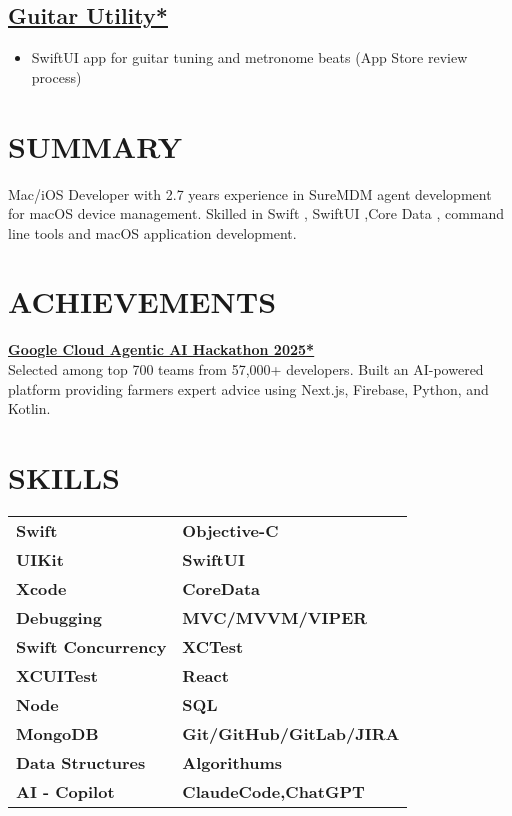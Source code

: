 \documentclass[10pt,a4paper]{moderncv}
\let\oldhref\href
\renewcommand{\href}[2]{\oldhref{#1}{\underline{#2}}}
\begin{document}
\begin{minipage}[t]{0.60\textwidth}
\subsection{\href{https://github.com/sachin6174/Guitar-Utility}{Guitar Utility*}}
\begin{itemize}
    \item SwiftUI app for guitar tuning and metronome beats (App Store review process)
\end{itemize}

\end{minipage}
\hfill
\begin{minipage}[t]{0.35\textwidth}
\section{SUMMARY}
Mac/iOS Developer with 2.7 years experience in SureMDM agent development for macOS device management. Skilled in Swift , SwiftUI ,Core Data , command line tools and macOS application development.

\section{ACHIEVEMENTS}
\textbf{\href{https://github.com/abhikumar002/Agentic-Gig-Project}{Google Cloud Agentic AI Hackathon 2025*}} \\
Selected among top 700 teams from 57,000+ developers. Built an AI-powered platform providing farmers expert advice using Next.js, Firebase, Python, and Kotlin.

\section{SKILLS}
\begin{tabularx}{\textwidth}{XX}
\textbf{Swift} & \textbf{Objective-C} \\
\textbf{UIKit} & \textbf{SwiftUI} \\
\textbf{Xcode} & \textbf{CoreData} \\
\textbf{Debugging} & \textbf{MVC/MVVM/VIPER} \\
\textbf{Swift Concurrency} & \textbf{XCTest} \\
\textbf{XCUITest} & \textbf{React} \\
\textbf{Node} & \textbf{SQL} \\
\textbf{MongoDB} & \textbf{Git/GitHub/GitLab/JIRA} \\
\textbf{Data Structures} & \textbf{Algorithums} \\
\textbf{AI - Copilot} & \textbf{ClaudeCode,ChatGPT} \\
\end{tabularx}


\end{minipage}
\end{document}
